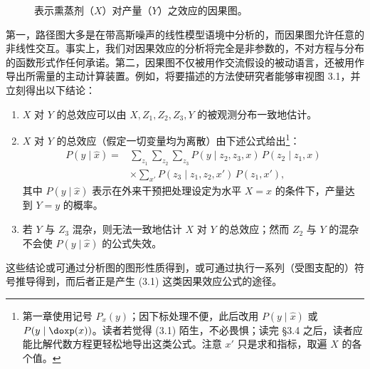 \begin{figure}[htbp]
\centering
{}
\caption{表示熏蒸剂（$X$）对产量（$Y$）之效应的因果图。}
\label{fig:3.1}
\end{figure}

第一，路径图大多是在带高斯噪声的线性模型语境中分析的，而因果图允许任意的非线性交互。事实上，我们对因果效应的分析将完全是非参数的，不对方程与分布的函数形式作任何承诺。第二，因果图不仅被用作交流假设的被动语言，还被用作导出所需量的主动计算装置。例如，将要描述的方法使研究者能够审视图 3.1，并立刻得出以下结论：
\begin{enumerate}[label=\arabic*.,leftmargin=1.8em]
\item $X$ 对 $Y$ 的总效应可以由 $X,Z_1,Z_2,Z_3,Y$ 的被观测分布一致地估计。
\item $X$ 对 $Y$ 的总效应（假定一切变量均为离散）由下述公式给出\footnote{第一章使用记号 $P_x(y)$；因下标处理不便，此后改用 $P(y\mid\hat{x})$ 或 $P(y\mid\doxp(x))$。读者若觉得 \textup{(3.1)} 陌生，不必畏惧；读完 \S 3.4 之后，读者应能比解代数方程更轻松地导出这类公式。注意 $x'$ 只是求和指标，取遍 $X$ 的各个值。}：
\begin{equation}
\begin{aligned}
P(y\mid\hat{x}) = {}& \sum_{z_1}\sum_{z_2}\sum_{z_3} P(y\mid z_2,z_3,x)\,P(z_2\mid z_1,x)\\
& \times \sum_{x'} P(z_3\mid z_1,z_2,x')\,P(z_1,x'),
\end{aligned} \tag{3.1}
\end{equation}
其中 $P(y\mid\hat{x})$ 表示在外来干预把处理设定为水平 $X=x$ 的条件下，产量达到 $Y=y$ 的概率。
\item 若 $Y$ 与 $Z_3$ 混杂，则无法一致地估计 $X$ 对 $Y$ 的总效应；然而 $Z_2$ 与 $Y$ 的混杂不会使 $P(y\mid\hat{x})$ 的公式失效。
\end{enumerate}
这些结论或可通过分析图的图形性质得到，或可通过执行一系列（受图支配的）符号推导得到，而后者正是产生 \textup{(3.1)} 这类因果效应公式的途径。

